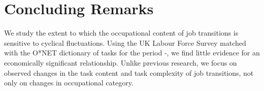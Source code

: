 \documentclass[12pt,authoryear]{elsarticle}
\begin{document}
\begin{comment}
	In each specification control variables are, for the most part, significant; in a number of cases they are a magnitude larger than the estimated coefficient on the unemployment rate. Older individuals (\textit{Age}) tend to make smaller task content and task complexity moves, consistent with the idea that individuals tend to specialise over their careers. For the same reasons, those with a higher relative to lower education level (\textit{High Education}), and those with greater tenure  (\textit{Tenure}) tend to make smaller task content and task complexity moves. Being full time relative to part time in a previous job (\textit{Full Time in Previous Job}) is associated with much lower task content and task complexity moves in all specifications, and at a magnitude of approximately ten times that of recessions. This suggests that full time workers are much less flexible in changing the content of their jobs when moving employers than part time workers are. Similarly, being fired from a first quarter job (\textit{Involuntary Separation}) is associated with much smaller task content and task complexity moves than quits.
	If an individuals' second quarter recorded occupation is temporary rather than permanent (\textit{Temporary in Current Job}), this is associated with much larger task content and task complexity moves. Again this association is an order of magnitude greater than that of recessions. The same is true for having a public sector rather than private sector job in the second quarter (\textit{Public Sector in Current Job}), being self employed in either the first or second quarter of interview (\textit{Self Employed in Previous/Current Job}) and applying to jobs via Job Centres (\textit{Search Method: Job Centre}) and Advertisements (\textit{Search Method: Advertisements}) relative to not searching for a job.
	
		\end{comment}
	
	\section{Concluding Remarks}
	\label{sec:Conclusion}
	

	We study the extent to which the occupational content of job transitions is sensitive to cyclical fluctuations. Using the UK Labour Force Survey matched with the O*NET dictionary of tasks for the period \hspace{-1mm}-\hspace{-1mm}, we find little evidence for an economically significant relationship. Unlike previous research, we focus on observed changes in the task content and task complexity of job transitions, not only on changes in occupational category. 
	
\end{document}

